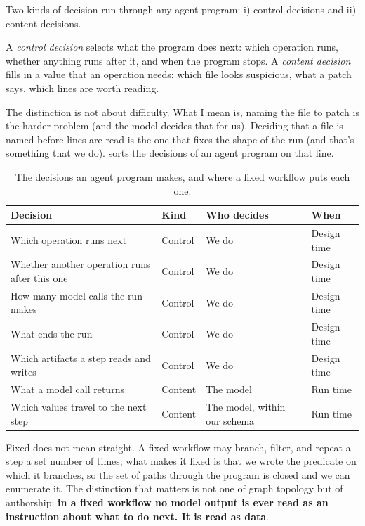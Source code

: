 Two kinds of decision run through any agent program: i) control decisions and ii) content
decisions. 

A \emph{control decision} selects what the program does next: which operation runs,
whether anything runs after it, and when the program stops. A \emph{content decision} fills in a
value that an operation needs: which file looks suspicious, what a patch says, which lines are
worth reading. 

The distinction is not about difficulty. What I mean is, naming the file to patch is the harder
problem (and the model decides that for us). Deciding that a file is named before lines are read is the one that fixes the shape of
the run (and that's something that we do).  sorts the decisions of an agent program on that line.

\begin{table}[htbp]
  \caption{The decisions an agent program makes, and where a fixed workflow puts each one.}
  \label{tab:fixed-decisions}
  \small
  \begin{tabularx}{\linewidth}{Xlll}
    \toprule
    Decision & Kind & Who decides & When \\
    \midrule
    Which operation runs next & Control & We do & Design time \\
    Whether another operation runs after this one & Control & We do & Design time \\
    How many model calls the run makes & Control & We do & Design time \\
    What ends the run & Control & We do & Design time \\
    Which artifacts a step reads and writes & Control & We do & Design time \\
    \midrule
    What a model call returns & Content & The model & Run time \\
    Which values travel to the next step & Content & The model, within our schema & Run time \\
    \bottomrule
  \end{tabularx}
\end{table}

Fixed does not mean straight. A fixed workflow may branch, filter, and repeat a step a set
number of times; what makes it fixed is that we wrote the predicate on which it branches, so the
set of paths through the program is closed and we can enumerate it. The distinction that matters
is not one of graph topology but of authorship: \textbf{in a fixed workflow no model output is ever read
as an instruction about what to do next. It is read as data}.

